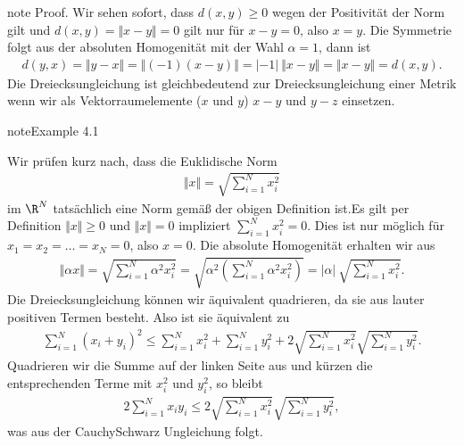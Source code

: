 \documentclass[letterpaper,10pt,english]{jupyterBook}
\begin{document}
\begin{sphinxadmonition}{note}
Proof. Wir sehen sofort, dass \(d(x,y) \geq 0\) wegen der Positivität der Norm gilt und \(d(x,y) = \Vert x - y\Vert = 0\) gilt nur für \(x-y = 0\), also \(x=y\). Die Symmetrie folgt aus der absoluten Homogenität mit der Wahl \(\alpha = 1\), dann ist
\begin{equation*}
\begin{split} d(y,x) = \Vert y- x \Vert = \Vert (-1)(x-y) \Vert = |-1|~\Vert x -y \Vert = \Vert x-y \Vert = d(x,y).\end{split}
\end{equation*}
Die Dreiecksungleichung ist  gleichbedeutend zur Dreiecksungleichung einer Metrik wenn wir als Vektorraumelemente (\(x\) und \(y\)) \(x-y\) und \(y-z\) einsetzen.
\end{sphinxadmonition}
\label{metrik/normen:example-3}
\begin{sphinxadmonition}{note}{Example 4.1}



Wir prüfen kurz nach, dass die Euklidische Norm
\begin{equation*}
\begin{split} \Vert x \Vert = \sqrt{\sum_{i=1}^N x_i^2}\end{split}
\end{equation*}
im \(\R^N\) tatsächlich eine Norm gemäß der obigen Definition ist.Es gilt per Definition \(\Vert x \Vert \geq 0\) und \(\Vert x \Vert = 0\) impliziert \(\sum_{i=1}^N x_i^2=0\). Dies ist nur möglich für \(x_1=x_2=\ldots=x_N=0\), also \(x=0\). Die absolute Homogenität erhalten wir aus
\begin{equation*}
\begin{split} \Vert \alpha x \Vert = \sqrt{\sum_{i=1}^N \alpha ^2 x_i^2} = \sqrt{\alpha^2 (\sum_{i=1}^N \alpha ^2 x_i^2)} = |\alpha|~ \sqrt{\sum_{i=1}^N x_i^2}. \end{split}
\end{equation*}
Die Dreiecksungleichung können wir äquivalent quadrieren, da sie aus lauter positiven Termen besteht. Also ist sie äquivalent zu
\begin{equation*}
\begin{split}  {\sum_{i=1}^N (x_i+y_i)^2} \leq \sum_{i=1}^N x_i^2 + \sum_{i=1}^N y_i^2 + 2 \sqrt{\sum_{i=1}^N x_i^2} \sqrt{\sum_{i=1}^N y_i^2}.\end{split}
\end{equation*}
Quadrieren wir die Summe auf der linken Seite aus und kürzen die entsprechenden Terme mit \(x_i^2\) und \(y_i^2\), so bleibt
\begin{equation*}
\begin{split} 2 \sum_{i=1}^N x_i y_i \leq 2 \sqrt{\sum_{i=1}^N x_i^2} \sqrt{\sum_{i=1}^N y_i^2},\end{split}
\end{equation*}
was aus der Cauchy\sphinxhyphen{}Schwarz Ungleichung folgt.
\end{sphinxadmonition}
\end{document}
